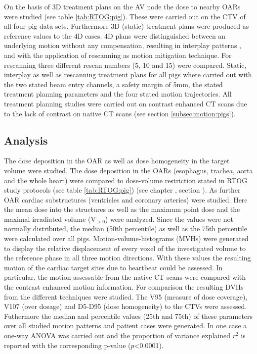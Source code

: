 \documentclass[type=dr, dr=rernat, accentcolor=tud7b,colorbacktitle, bigchapter, openright, twoside, 12pt ]{tudthesis}
\begin{document}
On the basis of 3D treatment plans on the AV node the dose to nearby OARs were studied (see table \ref{tab:RTOG:pig}). 
These were carried out on the CTV of all four pig data sets. Furthermore 3D (static) treatment plans were produced as reference values to the 
4D cases. 4D plans were distinguished between an underlying motion without any compensation, resulting in interplay patterns \cite{Phi92} 
\cite{Ber08}, and with the application of rescanning \cite{Phi92} as motion mitigation technique. For rescanning three different rescan 
numbers (5, 10 and 15) were compared.
Static, interplay as well as rescanning treatment plans for all pigs where carried out with the two stated beam entry channels,
a safety margin of 5mm, the stated treatment planning parameters and the four stated motion trajectories. 
All treatment planning studies were carried out on contrast enhanced CT scans due to the lack of contrast on native CT scans (see section 
\ref{subsec:motion:pigs}). 


\subsection{Analysis}

The dose deposition in the OAR as well as dose homogeneity in the target volume were studied. The dose deposition in the OARs 
(esophagus, trachea, aorta and the whole heart) were compared to dose-volume restriction stated in RTOG study protocols 
(see table \ref{tab:RTOG:pig}) \cite{RTOG0631} \cite{RTOG0915} (see chapter \label{chapter:human}, section \label{human:dose-volumeOar}). 
As further OAR cardiac substructures (ventricles and coronary arteries) were studied. Here the mean dose into the structures as well as the 
maximum point dose and the maximal irradiated volume (V$_{>0}$) were analyzed. Since the values were not normally distributed, the 
median (50th percentile) as well as the 75th percentile were calculated over all pigs. 
Motion-volume-histograms (MVHs) \cite{Ric13} were generated to display the relative displacement of every 
voxel of the investigated volume to the reference phase in all three motion directions. With these values the resulting motion of the cardiac 
target sites due to heartbeat could be assessed. In particular, the motion assessable from the native CT scans were compared with the contrast 
enhanced motion information. For comparison the resulting DVHs from the different techniques were studied. The V95 (measure of dose 
coverage), V107 (over dosage) and D5-D95 (dose homogeneity) to the CTVs were assessed. Futhermore the median and percentile values 
(25th and 75th) of these parameters over all studied motion patterns and patient cases were generated. In one case a one-way ANOVA was carried out 
and the proportion of variance explained $r^{2}$ is reported with the corresponding p-value ($p$<0.0001). 
\end{document}
